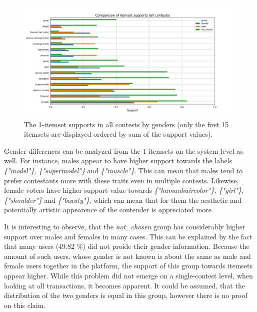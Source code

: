 \begin{figure}[h] 
    \begin{center}
        \includegraphics[width=1.0\textwidth]{Images/itemset_supports-gender-all_contests-1_itemset.png}
        \caption{The 1-itemset supports in all contests by genders (only the first 15 itemsets are displayed ordered by sum of the support values).}
        \label{itemset_supports-gender-all_contests-1_itemset}
    \end{center}
\end{figure}

Gender differences can be analyzed from the 1-itemsets on the system-level as well. For instance, males appear to have higher support towards the labels \textit{\{"model"\}, \{"supermodel"\}} and \textit{\{"muscle"\}}. This can mean that males tend to prefer contestants more with these traits even in multiple contests. Likewise, female voters have higher support value towards \textit{\{"human\:hair\:color"\}, \{"girl"\}, \{"shoulder"\}} and \textit{\{"beauty"\}}, which can mean that for them the aesthetic and potentially artistic appearence of the contender is appreciated more. 

It is interesting to observe, that the \textit{not\_chosen} group has considerably higher support over males and females in many cases. This can be explained by the fact that many users (49.82 \%) did not proide their gender information. Because the amount of such users, whose gender is not known is about the same as male and female users together in the platform, the support of this group towards itemsets appear higher. While this problem did not emerge on a single-contest level, when looking at all transactions, it becomes apparent. It could be assumed, that the distribution of the two genders is equal in this group, however there is no proof on this claim. 

